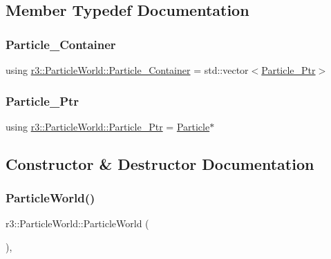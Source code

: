 \subsection{Member Typedef Documentation}
\mbox{\label{classr3_1_1_particle_world_aa354f6786c0837674fe8286f00465631}} 
\subsubsection{\texorpdfstring{Particle\+\_\+\+Container}{Particle\_Container}}
{\footnotesize\ttfamily using \mbox{\hyperlink{classr3_1_1_particle_world_aa354f6786c0837674fe8286f00465631}{r3\+::\+Particle\+World\+::\+Particle\+\_\+\+Container}} =  std\+::vector$<$\mbox{\hyperlink{classr3_1_1_particle_world_a12b4624a202a6b22629a3328f083ac81}{Particle\+\_\+\+Ptr}}$>$}

\mbox{\label{classr3_1_1_particle_world_a12b4624a202a6b22629a3328f083ac81}} 
\subsubsection{\texorpdfstring{Particle\+\_\+\+Ptr}{Particle\_Ptr}}
{\footnotesize\ttfamily using \mbox{\hyperlink{classr3_1_1_particle_world_a12b4624a202a6b22629a3328f083ac81}{r3\+::\+Particle\+World\+::\+Particle\+\_\+\+Ptr}} =  \mbox{\hyperlink{classr3_1_1_particle}{Particle}}$\ast$}



\subsection{Constructor \& Destructor Documentation}
\mbox{\label{classr3_1_1_particle_world_a5cd4bf68559cd0e1194420d3233b095e}} 
\subsubsection{\texorpdfstring{Particle\+World()}{ParticleWorld()}}
{\footnotesize\ttfamily r3\+::\+Particle\+World\+::\+Particle\+World (\begin{DoxyParamCaption}{ }\end{DoxyParamCaption})\hspace{0.3cm}{\ttfamily [explicit]}, {\ttfamily [default]}}

